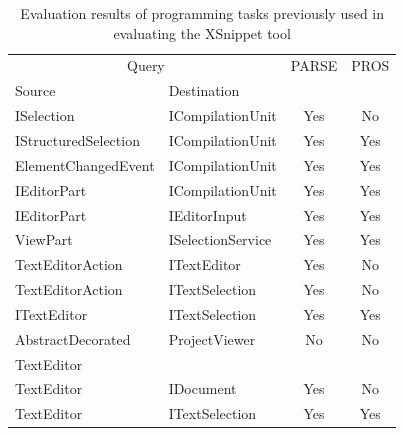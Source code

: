 \begin{table}[t]
\begin{SmallOut}
\begin{CodeOut}
\begin{center}
\centering \caption {\label{table:evaluation} Evaluation results of
programming tasks previously used in evaluating the XSnippet
tool}
\begin {tabular} {|l|l|c|c|}
\hline \multicolumn{2}{|c|}{Query}&PARSE&PROS\\
\cline{1-2}
Source&Destination&&\\
\hline
\hline ISelection&ICompilationUnit&Yes&No\\
\hline IStructuredSelection&ICompilationUnit&Yes&Yes\\
\hline ElementChangedEvent&ICompilationUnit&Yes&Yes\\
\hline IEditorPart&ICompilationUnit&Yes&Yes\\
\hline IEditorPart&IEditorInput&Yes&Yes\\
\hline ViewPart&ISelectionService&Yes&Yes\\
\hline TextEditorAction&ITextEditor&Yes&No\\
\hline TextEditorAction&ITextSelection&Yes&No\\
\hline ITextEditor&ITextSelection&Yes&Yes\\
\hline AbstractDecorated&ProjectViewer&No&No\\
             TextEditor&&&\\
\hline TextEditor&IDocument&Yes&No\\
\hline TextEditor&ITextSelection&Yes&Yes\\
\hline
\end{tabular}
\end{center}
\end{CodeOut}
\end{SmallOut}
\vspace*{-6ex}
\end{table}

